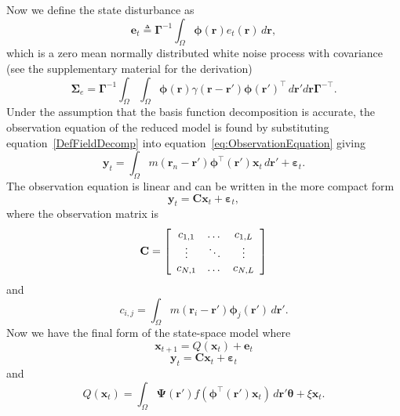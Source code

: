 \documentclass[12pt]{iopart}
\begin{document}
Now we define the state disturbance as
\begin{equation}\label{eq:Wt} 
	\mathbf{e}_t \triangleq \boldsymbol{\Gamma}^{-1}\int_\Omega {\boldsymbol{\phi} ( \mathbf{r} )e_t( \mathbf{r} ) \, d\mathbf{r}},
\end{equation}
which is a zero mean normally distributed white noise process with covariance (see the supplementary material for the derivation)
\begin{equation}
	\boldsymbol\Sigma_e =\mathbf{\Gamma}^{-1}\int_{\Omega}\int_{\Omega}\boldsymbol{\phi}\left(\mathbf r\right) \gamma\left(\mathbf r- \mathbf r' \right)\boldsymbol{\phi}\left(\mathbf r'\right)^{\top} \, d\mathbf r' d\mathbf r\mathbf{\Gamma}^{- \top}. 
\end{equation}
Under the assumption that the basis function decomposition is accurate, the observation equation of the reduced model is found by substituting equation~\ref{DefFieldDecomp} into equation~\ref{eq:ObservationEquation} giving
\begin{equation}\label{eq:ReducedObservationEquation}
	\mathbf{y}_t = \int_{\Omega}{m\left(\mathbf{r}_n-\mathbf{r}'\right)\boldsymbol{\phi}^{\top}\left(\mathbf{r'}\right) \mathbf{x}_t\, d\mathbf{r}'} + \boldsymbol{\varepsilon}_t. 
\end{equation}
The observation equation is linear and can be written in the more compact form
\begin{equation}\label{ObservationEquation} 
	\mathbf{y}_t = \mathbf{C}\mathbf{x}_t + \boldsymbol{\varepsilon}_t,
\end{equation}
where the observation matrix is 
\begin{equation}
	\mathbf{C} = \left[
	\begin{array}{{ccc}} 
		c_{1,1} & \dots & c_{1,L} \\
		\vdots & \ddots & \vdots \\
		c_{N,1} & \dots & c_{N,L} 
	\end{array}
	\right] 
\end{equation}
and 
\begin{equation}
	c_{i,j} = \int_{\Omega}m(\mathbf{r}_i - \mathbf{r}')\boldsymbol{\phi}_j(\mathbf{r}') \, d\mathbf{r}'. 
\end{equation}
Now we have the final form of the state-space model where
\begin{equation}\label{eq:finalformstatespacemodel}
	\mathbf{x}_{t+1} = Q(\mathbf{x}_t) +\mathbf{e}_t
\end{equation}
\begin{equation} 
	\mathbf{y}_t = \mathbf{C}\mathbf{x}_t + \boldsymbol{\varepsilon}_t
\end{equation}
and 
\begin{equation}\label{eq:QmatrixForSigmapoints}
	Q(\mathbf{x}_t) = \int_\Omega \boldsymbol{\Psi}(\mathbf{r}') f(\boldsymbol{\phi}^{\top}(\mathbf{r}')\mathbf{x}_t) \, d\mathbf{r}' \boldsymbol{\theta} + \xi\mathbf{x}_t.
\end{equation}
\end{document}
